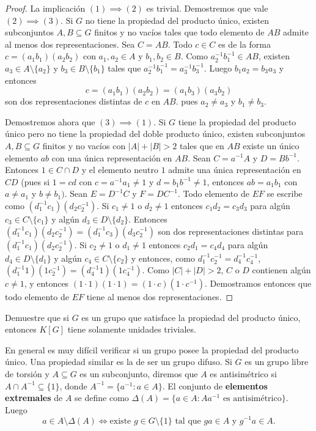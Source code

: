 \begin{proof}
	La implicación $(1)\implies(2)$ es trivial.  Demostremos que vale
	$(2)\implies(3)$. Si $G$ no tiene la propiedad del producto único, existen
	subconjuntos $A,B\subseteq G$ finitos y no vacíos tales que todo elemento
	de $AB$ admite al menos dos representaciones. Sea $C=AB$. Todo $c\in C$ es
	de la forma $c=(a_1b_1)(a_2b_2)$ con $a_1,a_2\in A$ y $b_1,b_2\in B$. Como
	$a_2^{-1}b_1^{-1}\in AB$, existen $a_3\in A\setminus\{a_2\}$ y $b_3\in B\setminus\{b_1\}$ tales que
	$a_2^{-1}b_1^{-1}=a_3^{-1}b_3^{-1}$. Luego $b_1a_2=b_3a_3$ y entonces
	\[
	c=(a_1b_1)(a_2b_2)=(a_1b_3)(a_3b_2)
	\]
	son dos representaciones distintas de $c$ en $AB$.
	pues $a_2\ne a_3$ y $b_1\ne b_3$.

	Demostremos ahora que $(3)\implies(1)$. Si $G$ tiene la propiedad del
	producto único pero no tiene la propiedad del doble producto único, existen
	subconjuntos $A,B\subseteq G$ finitos y no vacíos con $|A|+|B|>2$ tales que
	en $AB$ existe un único elemento $ab$ con una única representación en $AB$.
	Sean $C=a^{-1}A$ y $D=Bb^{-1}$. Entonces $1\in C\cap D$ y el elemento
	neutro $1$ admite una única representación en $CD$ (pues si $1=cd$ con
	$c=a^{-1}a_1\ne 1$ y $d=b_1b^{-1}\ne 1$, entonces $ab=a_1b_1$ con $a\ne
	a_1$ y $b\ne b_1)$. Sean $E=D^{-1}C$ y $F=DC^{-1}$. Todo elemento de $EF$
	se escribe como $(d_1^{-1}c_1)(d_2c_2^{-1})$. Si $c_1\ne 1$ o $d_2\ne 1$
	entonces $c_1d_2=c_3d_3$ para algún $c_3\in C\setminus\{c_1\}$ y algún
	$d_3\in D\setminus\{d_2\}$. Entonces
	$(d_1^{-1}c_1)(d_2c_2^{-1})=(d_1^{-1}c_3)(d_3c_2^{-1})$ son dos
	representaciones distintas para $(d_1^{-1}c_1)(d_2c_2^{-1})$. Si $c_2\ne 1$
	o $d_1\ne 1$ entonces $c_2d_1=c_4d_4$ para algún $d_4\in D\setminus\{d_1\}$
	y algún $c_4\in C\setminus\{c_2\}$ y entonces, como
	$d_1^{-1}c_2^{-1}=d_4^{-1}c_4^{-1}$,
	$(d_1^{-1}1)(1c_2^{-1})=(d_4^{-1}1)(1c_4^{-1})$.  Como $|C|+|D|>2$, $C$ o
	$D$ contienen algún $c\ne1$, y entonces $(1\cdot 1)(1\cdot 1)=(1\cdot
	c)(1\cdot c^{-1})$. Demostramos entonces que todo elemento de $EF$ tiene al
	menos dos representaciones. 
\end{proof}

\begin{exercise}
	Demuestre que si $G$ es un grupo que satisface la propiedad del producto
	único, entonces $K[G]$ tiene solamente unidades triviales.
\end{exercise}

En general es muy difícil verificar si un grupo posee la propiedad del producto
único. Una propiedad similar es la de ser un grupo difuso. Si $G$ es un grupo
libre de torsión y $A\subseteq G$ es un subconjunto, diremos que $A$ es
antisimétrico si $A\cap A^{-1}\subseteq\{1\}$, donde $A^{-1}=\{a^{-1}:a\in
A\}$. El conjunto de \textbf{elementos extremales} de $A$ se define como
$\Delta(A)=\{a\in A:Aa^{-1}\text{ es antisimétrico}\}$. Luego
\[
	a\in A\setminus\Delta(A)
	\Longleftrightarrow
	\text{existe $g\in G\setminus\{1\}$ tal que $ga\in A$ y $g^{-1}a\in A$}.
\]

